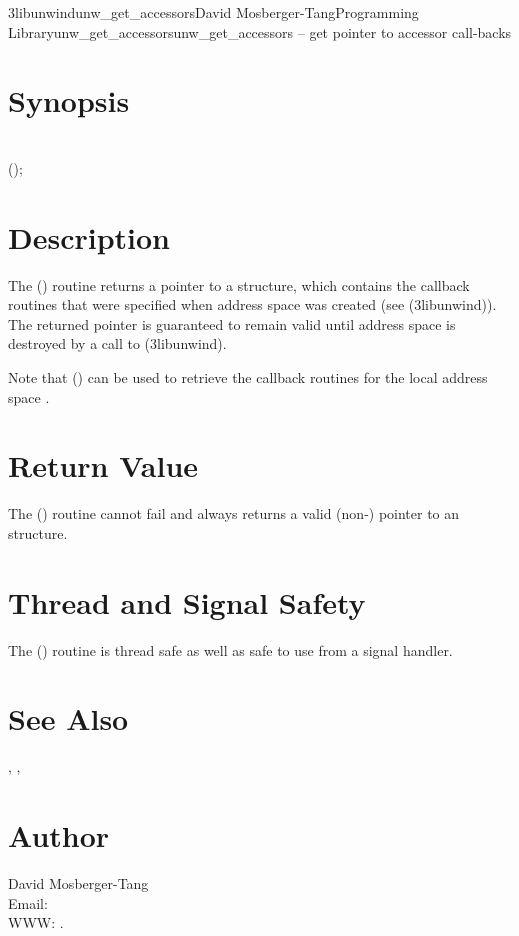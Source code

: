 \documentclass{article}
\begin{document}
\begin{Name}{3libunwind}{unw\_get\_accessors}{David Mosberger-Tang}{Programming Library}{unw\_get\_accessors}unw\_get\_accessors -- get pointer to accessor call-backs
\end{Name}

\section{Synopsis}

\\

();\\

\section{Description}

The () routine returns a pointer to a
 structure, which contains the callback
routines that were specified when address space  was created
(see (3libunwind)).  The returned pointer is
guaranteed to remain valid until address space  is destroyed
by a call to (3libunwind).

Note that () can be used to retrieve the
callback routines for the local address space
.

\section{Return Value}

The () routine cannot fail and always
returns a valid (non-) pointer to an
 structure.

\section{Thread and Signal Safety}

The () routine is thread safe as well as
safe to use from a signal handler.

\section{See Also}

,
,

\section{Author}

\noindent
David Mosberger-Tang\\
Email: \\
WWW: .
\LatexManEnd
\end{document}
